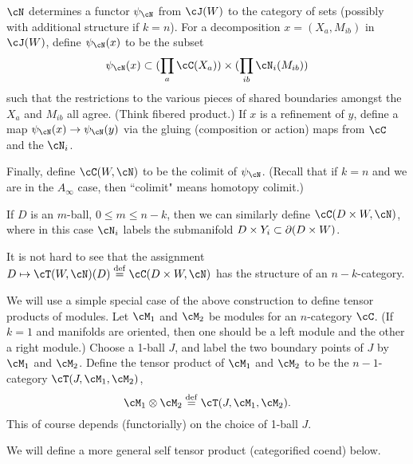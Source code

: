 $\cN$ determines 
a functor $\psi_\cN$ from $\cJ(W)$ to the category of sets 
(possibly with additional structure if $k=n$).
For a decomposition $x = (X_a, M_{ib})$ in $\cJ(W)$, define $\psi_\cN(x)$ to be the subset
\[
	\psi_\cN(x) \sub (\prod_a \cC(X_a)) \times (\prod_{ib} \cN_i(M_{ib}))
\]
such that the restrictions to the various pieces of shared boundaries amongst the
$X_a$ and $M_{ib}$ all agree.
(Think fibered product.)
If $x$ is a refinement of $y$, define a map $\psi_\cN(x)\to\psi_\cN(y)$
via the gluing (composition or action) maps from $\cC$ and the $\cN_i$.

Finally, define $\cC(W, \cN)$ to be the colimit of $\psi_\cN$.
(Recall that if $k=n$ and we are in the $A_\infty$ case, then ``colimit" means
homotopy colimit.)

If $D$ is an $m$-ball, $0\le m \le n-k$, then we can similarly define
$\cC(D\times W, \cN)$, where in this case $\cN_i$ labels the submanifold 
$D\times Y_i \subset \partial(D\times W)$.

It is not hard to see that the assignment $D \mapsto \cT(W, \cN)(D) \deq \cC(D\times W, \cN)$
has the structure of an $n{-}k$-category.

\medskip



We will use a simple special case of the above 
construction to define tensor products 
of modules.
Let $\cM_1$ and $\cM_2$ be modules for an $n$-category $\cC$.
(If $k=1$ and manifolds are oriented, then one should be 
a left module and the other a right module.)
Choose a 1-ball $J$, and label the two boundary points of $J$ by $\cM_1$ and $\cM_2$.
Define the tensor product of $\cM_1$ and $\cM_2$ to be the 
$n{-}1$-category $\cT(J, \cM_1, \cM_2)$,
\[
	\cM_1\otimes \cM_2 \deq \cT(J, \cM_1, \cM_2) .
\]
This of course depends (functorially)
on the choice of 1-ball $J$.

We will define a more general self tensor product (categorified coend) below.









